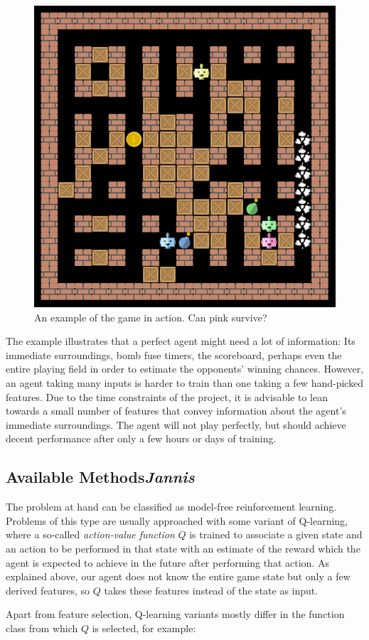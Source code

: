 \documentclass{article}
\begin{document}
\begin{figure}[h]
    \centering
    \includegraphics[width=.6\linewidth]{figures/bomberman_example.png}
    \caption{An example of the game in action. Can pink survive?}
    \label{fig:bomberman-example}
\end{figure}

The example illustrates that a perfect agent might need a lot of information: Its immediate surroundings, bomb fuse timers, the scoreboard, perhaps even the entire playing field in order to estimate the opponents' winning chances. However, an agent taking many inputs is harder to train than one taking a few hand-picked features. Due to the time constraints of the project, it is advisable to lean towards a small number of features that convey information about the agent's immediate surroundings. The agent will not play perfectly, but should achieve decent performance after only a few hours or days of training.

\clearpage

\subsection[Available Methods]{{Available Methods}\normalsize \normalfont \it \hfill Jannis}

The problem at hand can be classified as model-free reinforcement learning. Problems of this type are usually approached with some variant of Q-learning, where a so-called \textit{action-value function} $Q$ is trained to associate a given state and an action to be performed in that state with an estimate of the reward which the agent is expected to achieve in the future after performing that action. As explained above, our agent does not know the entire game state but only a few derived features, so $Q$ takes these features instead of the state as input.\par
Apart from feature selection, Q-learning variants mostly differ in the function class from which $Q$ is selected, for example:
\end{document}
